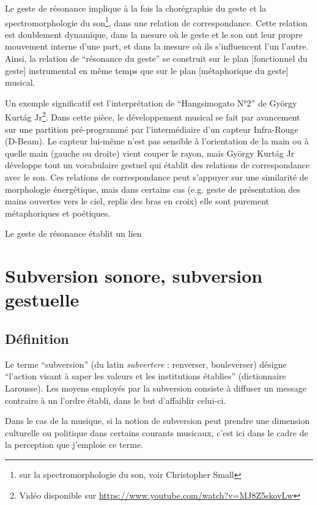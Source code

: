 Le geste de résonance implique à la fois la chorégraphie du geste et la spectromorphologie du son\footnote{sur la spectromorphologie du son, voir Christopher Small}, dans une relation de correspondance. Cette relation est doublement dynamique, dans la mesure où le geste et le son ont leur propre mouvement interne d'une part, et dans la mesure où ils s'influencent l'un l'autre. Ainsi, la relation de ``résonance du geste'' se construit sur le plan [fonctionnel du geste] instrumental en même temps que sur le plan [métaphorique du geste] musical.

Un exemple significatif est l'interprétation de ``Hangsimogato N°2'' de György Kurtág Jr\footnote{Vidéo disponible sur \url{https://www.youtube.com/watch?v=MJ8Z5skovLw}}. Dans cette pièce, le développement musical se fait par avancement sur une partition pré-programmé par l'intermédiaire d'un capteur Infra-Rouge (D-Beam). Le capteur lui-même n'est pas sensible à l'orientation de la main ou à quelle main (gauche ou droite) vient couper le rayon, mais György Kurtág Jr développe tout un vocabulaire gestuel qui établit des relations de correspondance avec le son. Ces relations de correspondance peut s'appuyer sur une similarité de morphologie énergétique, mais dans certains cas (e.g. geste de présentation des mains ouvertes vers le ciel, replis des bras en croix) elle sont purement métaphoriques et poétiques.



Le geste de résonance établit un lien



\section{Subversion sonore, subversion gestuelle}

\subsection{Définition} 

Le terme ``subversion'' (du latin \textit{subvertere} : renverser, bouleverser) désigne ``l'action visant à saper les valeurs et les institutions établies'' (dictionnaire Larousse). Les moyens employés par la subversion consiste à diffuser un message contraire à un l'ordre établi, dans le but d'affaiblir celui-ci.

Dans le cas de la musique, si la notion de subversion peut prendre une dimension culturelle ou politique dans certains courants musicaux, c'est ici dans le cadre de la perception que j'emploie ce terme.



